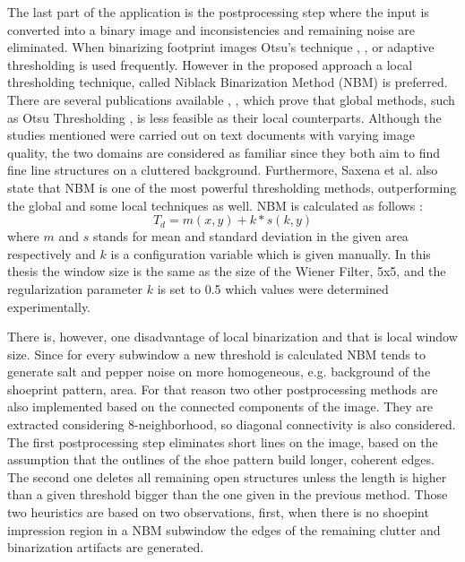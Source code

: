 \documentclass[draft,final]{vutinfth} %
\begin{document}
\par
The last part of the application is the postprocessing step where the input is converted into a binary image and inconsistencies and remaining noise are eliminated.
When binarizing footprint images Otsu's technique \cite{algarni2008novel}, \cite{alizadeh2017automatic}, \cite{wu2019crime} or adaptive thresholding \cite{wang2014automatic} is used frequently.
However in the proposed approach a local thresholding technique, called Niblack Binarization Method (NBM) \cite{niblack1985introduction} is preferred.
There are several publications available \cite{som2011application}, \cite{athimethphat2011review}, which prove that global methods, such as Otsu Thresholding \cite{otsu1979threshold}, is less feasible as their local counterparts.
Although the studies mentioned were carried out on text documents with varying image quality, the two domains are considered as familiar since they both aim to find fine line structures on a cluttered background.
Furthermore, Saxena et al. \cite{saxena2019niblack} also state that NBM is one of the most powerful thresholding methods, outperforming the global and some local techniques as well. 
NBM  is calculated as follows \cite{saxena2019niblack}:
\[T_d = m(x,y) + k * s(k, y)\]
where $m$ and $s$ stands for mean and standard deviation in the given area respectively and $k$ is a configuration variable which is given manually. 
In this thesis the window size is the same as the size of the Wiener Filter, 5x5, and the regularization parameter $k$ is set to 0.5 which values were determined experimentally.
\par
There is, however, one disadvantage of local binarization and that is local window size.
Since for every subwindow a new threshold is calculated NBM tends to generate salt and pepper noise on more homogeneous, e.g. background of the shoeprint pattern, area.
For that reason two other postprocessing methods are also implemented based on the connected components of the image.
They are extracted considering 8-neighborhood, so diagonal connectivity is also considered.
The first postprocessing step eliminates short lines on the image, based on the assumption that the outlines of the shoe pattern build longer, coherent edges.
The second one deletes all remaining open structures unless the length is higher than a given threshold bigger than the one given in the previous method.
Those two heuristics are based on two observations, first,  when there is no shoepint impression region in a NBM subwindow the edges of the remaining clutter and binarization artifacts are generated.
\end{document}
